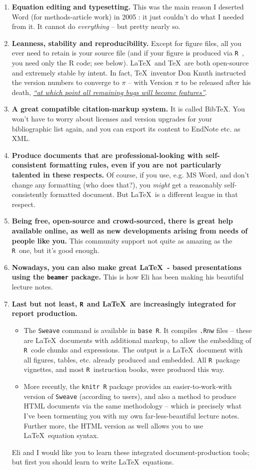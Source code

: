 \documentclass{article}
\newcommand{\R} {\texttt{R\ }}
\newcommand{\tex}{\LaTeX \   }
\begin{document}
\begin{enumerate}
	\item \textbf{Equation editing and typesetting.} This was the main reason I deserted Word (for methods-article work) in 2005 : it just couldn't do what I needed from it. It cannot do \emph{everything} -- but pretty nearly so.
	\item \textbf{Leanness, stability and reproducibility.} Except for figure files, all you ever need to retain is your source file (and if your figure is produced via \R, you need only the R code; see below).  \tex and \TeX \ are both open-source and extremely stable by intent. In fact, \TeX \ inventor Don Knuth instructed the version numbers to converge to $\pi$ -- with Version $\pi$ to be released after his death, \href{http://en.wikipedia.org/wiki/TeX}{\emph{``at which point all remaining bugs will become features''}}.
	\item \textbf{A great compatible citation-markup system.} It is called BibTeX. You won't have to worry about licenses and version upgrades for your bibliographic list again, and you can export its content to EndNote etc. as XML.
	\item \textbf{Produce documents that are professional-looking with self-consistent formatting rules, even if you are not particularly talented in these respects.} Of course, if you use, e.g. MS Word, and don't change any formatting (who does that?), you \emph{might} get a reasonably self-consistently formatted document. But \tex is a different league in that respect.
	\item \textbf{Being free, open-source and crowd-sourced, there is great help available online, as well as new developments arising from needs of people like you.} This community support not quite as amazing as the \R one, but it's good enough. 
	\item \textbf{Nowadays, you can also make great \tex - based presentations using the \texttt{beamer} package.} This is how Eli has been making his beautiful lecture notes.
	\item \textbf{Last but not least, \R and \tex are increasingly integrated for report production.} 
		\begin{itemize}
			\item The \texttt{Sweave} command is available in \texttt{base R}. It compiles \texttt{.Rnw} files -- these are \tex documents with additional markup, to allow the embedding of \R code chunks and expressions. The output is a \tex document with all figures, tables, etc. already produced and embedded. All \R package vignettes, and most \R instruction books, were produced this way.
			\item More recently, the \texttt{knitr R} package provides an easier-to-work-with version of \texttt{Sweave} (according to users), and also a method to produce HTML documents via the same methodology -- which is precisely what I've been tormenting you with my own far-less-beautiful lecture notes. Further more, the HTML version as well allows you to use \tex equation syntax.
	\end{itemize}
	Eli and I would like you to learn these integrated document-production tools; but first you should learn to write \tex equations.
 \end{enumerate}
\end{document}
